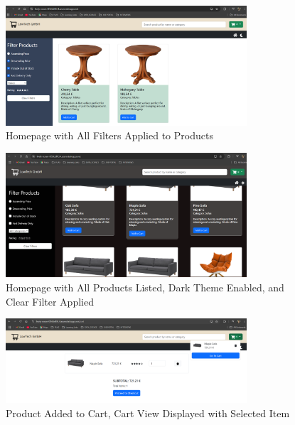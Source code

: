 \documentclass{llncs}
\begin{document}
\begin{figure}[H]
    \centering
    \includegraphics[width=0.8\textwidth]{../images/HomePage_AppliedFilters.png}  %
    \vspace{3mm}  %
    \caption{Homepage with All Filters Applied to Products}
    \label{fig:homepage_filters}
\end{figure}

\vspace{10mm}  %

\begin{figure}[H]
    \centering
    \includegraphics[width=0.8\textwidth]{../images/DarkTheme_Load.png}  %
    \vspace{3mm}  %
    \caption{Homepage with All Products Listed, Dark Theme Enabled, and Clear Filter Applied}
    \label{fig:homepage_filters_2}
\end{figure}

\vspace{10mm}  %

\begin{figure}[H]
    \centering
    \includegraphics[width=0.8\textwidth]{../images/Item_Added_Cart.png}  %
    \vspace{3mm}  %
    \caption{Product Added to Cart, Cart View Displayed with Selected Item}
    \label{fig:Webshop_3}
\end{figure}
\end{document}
